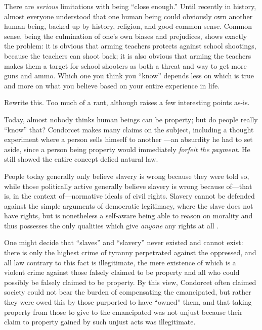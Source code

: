 There are \textit{serious} limitations with being ``close enough.''  Until recently in history, almost everyone understood that one human being could obviously own another human being, backed up by history, religion, and good common sense.  Common sense, being the culmination of one's own biases and prejudices, shows exactly the problem:  it is obvious that arming teachers protects against school shootings, because the teachers can shoot back; it is also obvious that arming the teachers makes them a target for school shooters as both a threat and way to get more guns and ammo.  Which one you think you ``know'' depends less on which is true and more on what you believe based on your entire experience in life.

\begin{todo}
    Rewrite this.  Too much of a rant, although raises a few interesting points as-is.
\end{todo}
Today, almost nobody thinks human beings can be property; but do people really ``know'' that?  Condorcet makes many claims on the subject, including a thought experiment where a person sells himself to another \autocite{Condorcet1781}—an absurdity he had to set aside, since a person being property would immediately \textit{forfeit the payment}.  He still showed the entire concept defied natural law.

People today generally only believe slavery is wrong because they were told so, while those politically active generally believe slavery is wrong because of—that is, in the context of—normative ideals of civil rights.  Slavery cannot be defended against the simple arguments of democratic legitimacy, where the slave does not have rights, but is nonetheless a self-aware being able to reason on morality and thus possesses the only qualities which give \textit{anyone} any rights at all \autocite{Condorcet1789}.

One might decide that ``slaves'' and ``slavery'' never existed and cannot exist:  there is only the highest crime of tyranny perpetrated against the oppressed, and all law contrary to this fact is illegitimate, the mere existence of which is a violent crime against those falsely claimed to be property and all who could possibly be falsely claimed to be property.  By this view, Condorcet often claimed society could not bear the burden of compensating the emancipated, but rather they were owed this by those purported to have ``owned'' them, and that taking property from those to give to the emancipated was not unjust because their claim to property gained by such unjust acts was illegitimate.

